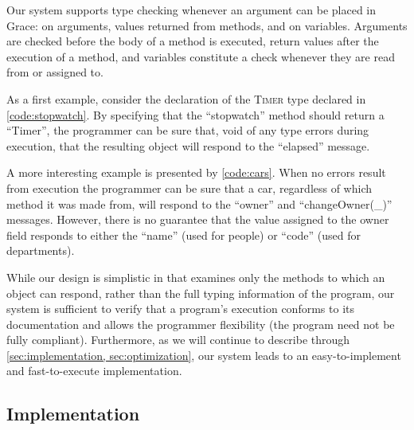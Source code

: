 Our system supports type checking whenever an argument can be placed in Grace: 
on arguments, values returned from methods, and on variables.
Arguments are checked before the body of a method is executed,
return values after the execution of a method, and
variables constitute a check whenever they are read from or assigned to.

As a first example, 
consider the declaration of the \textsc{Timer} type declared in \cref{code:stopwatch}. 
By specifying that the ``stopwatch'' method should return a ``Timer'', 
the programmer can be sure that, void of any type errors during execution,
that the resulting object will respond to the ``elapsed'' message.



A more interesting example is presented by \cref{code:cars}. 
When no errors result from execution the programmer can be sure that a car, 
regardless of which method it was made from, 
will respond to the ``owner'' and ``changeOwner(\_)'' messages.
However, there is no guarantee that the value assigned to the owner field responds to
either the ``name'' (used for people) or ``code'' (used for departments). 



While our design is simplistic in that examines only the methods to which an object can respond,
rather than the full typing information of the program,
our system is sufficient to verify that a program's execution conforms to its documentation
and allows the programmer flexibility (the program need not be fully compliant).
Furthermore, as we will continue to describe through \cref{sec:implementation, sec:optimization}, 
our system leads to an easy-to-implement and fast-to-execute implementation.




\subsection{Implementation}
\label{sec:implementation}

